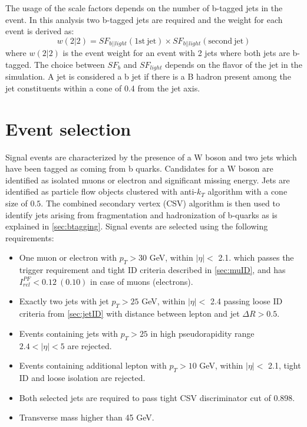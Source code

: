 The usage of the scale factors depends on the number of b-tagged jets in the event. In this analysis two b-tagged jets are required and the weight for each event is derived as:
\begin{equation}
w(2|2)=SF_{b||light}(\mathrm{1st\ jet})\times SF_{b||light}(\mathrm{second\ jet})
\end{equation}
where $w(2|2)$ is the event weight for an event with 2 jets where both jets are b-tagged. The choice between $SF_{b}$ and $SF_{light}$ depends on the flavor of the jet in the simulation. A jet is considered a b jet if there is a B hadron present among the jet constituents within a cone of 0.4 from the jet axis.    




\section{Event selection}
\label{sec:selection}
Signal events are characterized by the presence of a W boson and two jets which have been tagged as coming from b quarks. 
Candidates for a W boson are identified as isolated muons or electron and significant missing energy. 
Jets are identified as particle flow objects clustered with anti-$k_T$ algorithm with a cone size of $0.5$.
The combined secondary vertex (CSV) algorithm is then used to identify jets arising from fragmentation and hadronization of b-quarks as is explained in \ref{sec:btagging}. Signal events are selected using the following requirements:
\begin{itemize}
\item One muon or electron with $p_T>30$ GeV, within $|\eta|<$ 2.1. which passes the trigger requirement and tight ID criteria described in \ref{sec:muID}, and has $I_{rel}^{PF}<0.12\ (0.10)$ in case of muons (electrons).
\item Exactly two jets with jet $p_T>25$ GeV, within $|\eta|<$ 2.4 passing loose ID criteria from \ref{sec:jetID} with distance between lepton and jet $\Delta R>0.5$. 
\item Events containing jets with $p_T>25$ in high pseudorapidity range $2.4<|\eta|<5$ are rejected.
\item Events containing additional lepton with $p_T>10$ GeV, within $|\eta|<$ 2.1, tight ID and loose isolation are rejected.
\item Both selected jets are required to pass tight CSV discriminator cut of 0.898.
\item Transverse mass higher than 45 GeV.
\end{itemize} 

